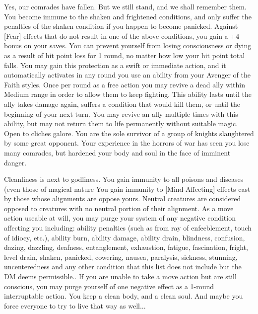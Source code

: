 \begin{optional}
{Yes, our comrades have fallen. But we still stand, and we shall remember them.}
{You become immune to the shaken and frightened conditions, and only suffer the penalties of the shaken condition if you happen to become panicked. Against [Fear] effects that do not result in one of the above conditions, you gain a +4 bonus on your saves.}
{You can prevent yourself from losing consciousness or dying as a result of hit point loss for 1 round, no matter how low your hit point total falls. You may gain this protection as a swift or immediate action, and it automatically activates in any round you use an ability from your Avenger of the Faith styles.}
{Once per round as a free action you may revive a dead ally within Medium range in order to allow them to keep fighting. This ability lasts until the ally takes damage again, suffers a condition that would kill them, or until the beginning of your next turn. You may revive an ally multiple times with this ability, but may not return them to life permanently without suitable magic.}
{Open to cliches galore. You are the sole survivor of a group of knights slaughtered by some great opponent. Your experience in the horrors of war has seen you lose many comrades, but hardened your body and soul in the face of imminent danger.}

{Cleanliness is next to godliness.}
{You gain immunity to all poisons and diseases (even those of magical nature}
{You gain immunity to [Mind-Affecting] effects cast by those whose alignments are oppose yours. Neutral creatures are considered opposed to creatures with no neutral portion of their alignment.}
{As a move action useable at will, you may purge your system of any negative condition affecting you including: ability penalties (such as from ray of enfeeblement, touch of idiocy, etc.), ability burn, ability damage, ability drain, blindness, confusion, dazing, dazzling, deafness, entanglement, exhaustion, fatigue, fascination, fright, level drain, shaken, panicked, cowering, nausea, paralysis, sickness, stunning, uncenteredness and any other condition that this list does not include but the DM deems permissible.. If you are unable to take a move action but are still conscious, you may purge yourself of one negative effect as a 1-round interruptable action.}
{You keep a clean body, and a clean soul. And maybe you force everyone to try to live that way as well...}


\end{optional}
